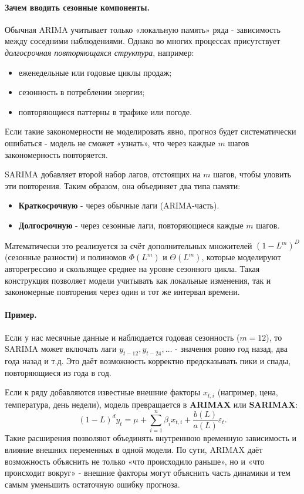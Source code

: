\documentclass[12pt,a4paper]{article}
\begin{document}
\paragraph{Зачем вводить сезонные компоненты.}
Обычная ARIMA учитывает только «локальную память» ряда - зависимость между соседними наблюдениями.
Однако во многих процессах присутствует \emph{долгосрочная повторяющаяся структура}, например:
\begin{itemize}
    \item еженедельные или годовые циклы продаж;
    \item сезонность в потреблении энергии;
    \item повторяющиеся паттерны в трафике или погоде.
\end{itemize}
Если такие закономерности не моделировать явно, прогноз будет систематически ошибаться - модель не сможет «узнать», что через каждые $m$ шагов закономерность повторяется.

SARIMA добавляет второй набор лагов, отстоящих на $m$ шагов, чтобы уловить эти повторения.
Таким образом, она объединяет два типа памяти:
\begin{itemize}
    \item \textbf{Краткосрочную} - через обычные лаги (ARIMA-часть).
    \item \textbf{Долгосрочную} - через сезонные лаги, повторяющиеся каждые $m$ шагов.
\end{itemize}

Математически это реализуется за счёт дополнительных множителей $(1-L^m)^D$ (сезонные разности) и полиномов $\Phi(L^m)$ и $\Theta(L^m)$, которые моделируют авторегрессию и скользящее среднее на уровне сезонного цикла.
Такая конструкция позволяет модели учитывать как локальные изменения, так и закономерные повторения через один и тот же интервал времени.

\paragraph{Пример.}
Если у нас месячные данные и наблюдается годовая сезонность ($m=12$), то SARIMA может включать лаги $y_{t-12}, y_{t-24}, \dots$ - значения ровно год назад, два года назад и т.д. Это даёт возможность корректно предсказывать пики и спады, повторяющиеся из года в год.

\medskip
Если к ряду добавляются известные внешние факторы $x_{t,i}$ (например, цена, температура, день недели), модель превращается в \textbf{ARIMAX} или \textbf{SARIMAX}:
\[
(1-L)^d y_t = \mu + \sum_{i=1}^{n} \beta_i x_{t,i} + \frac{b(L)}{a(L)} \varepsilon_t.
\]
Такие расширения позволяют объединять внутреннюю временную зависимость и влияние внешних переменных в одной модели.
По сути, ARIMAX даёт возможность объяснить не только «что происходило раньше», но и «что происходит вокруг» - внешние факторы могут объяснить часть динамики и тем самым уменьшить остаточную ошибку прогноза.
\end{document}

